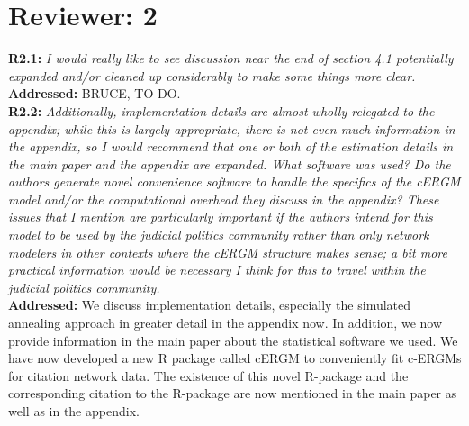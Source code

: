 \documentclass[a4paper,11pt]{texMemo}
\begin{document}
\section*{Reviewer: 2}


\noindent \textbf{R2.1:} \emph{ I would really like to see discussion near the end of section 4.1 potentially expanded and/or cleaned up considerably to make some things more clear.}\\

\noindent \textbf{Addressed:}  BRUCE, TO DO.\\

\noindent \textbf{R2.2:} \emph{ Additionally, implementation details are almost wholly relegated to the appendix; while this is largely appropriate, there is not even much information in the appendix, so I would recommend that one or both of the estimation details in the main paper and the appendix are expanded. What software was used? Do the authors generate novel convenience software to handle the specifics of the cERGM model and/or the computational overhead they discuss in the appendix? These issues that I mention are particularly important if the authors intend for this model to be used by the judicial politics community rather than only network modelers in other contexts where the cERGM structure makes sense; a bit more practical information would be necessary I think for this to travel within the judicial politics community.}\\

\noindent \textbf{Addressed:}  We discuss implementation details, especially the simulated annealing approach in greater detail in the appendix now. In addition, we now provide information in the main paper about the statistical software we used. We have now developed a new R package called cERGM to conveniently fit c-ERGMs for citation network data. The existence of this novel R-package and the corresponding citation to the R-package are now mentioned in the main paper as well as in the appendix. \\
\end{document}
